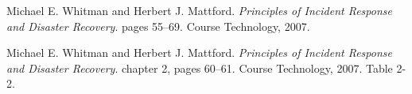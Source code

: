 \documentclass[english]{gucreport}
\begin{document}
	\makefrontpages
	\tableofcontents
	\showindex		%
	
	
	
	
	
	
	
	\begin{thebibliography}{99}
			Michael E. Whitman and Herbert J. Mattford.
			\emph{Principles of Incident Response and Disaster Recovery}.
			pages 55–69.
			Course Technology, 2007.
			
			Michael E. Whitman and Herbert J. Mattford.
			\emph{Principles of Incident Response and Disaster Recovery}.
			chapter 2, 	pages 60–61.
			Course Technology, 2007.
			Table 2-2.
	\end{thebibliography}

	\appendix %
\end{document}
